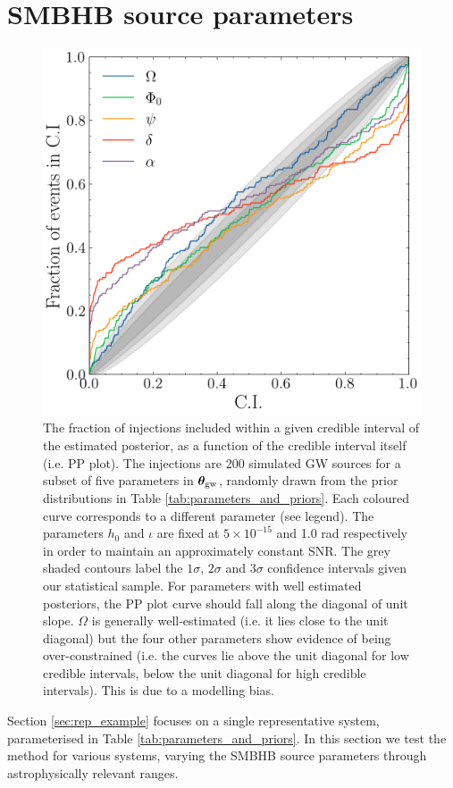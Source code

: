 \documentclass[fleqn,usenatbib,useAMS]{mnras}
\begin{document}
\section{SMBHB source parameters} \label{sec:parameter_space}
\begin{figure}
	\centering
	\includegraphics[width=\columnwidth]{images/pp_plot_new}
	\caption{The fraction of injections included within a given credible interval of the estimated posterior, as a function of the credible interval itself (i.e. PP plot). The injections are 200 simulated GW sources for a subset of five parameters in $\boldsymbol{\theta}_{\rm gw}$, randomly drawn from the prior distributions in Table \ref{tab:parameters_and_priors}. Each coloured curve corresponds to a different parameter (see legend). The parameters $h_0$ and $\iota$ are fixed at $5 \times 10^{-15}$ and 1.0 rad respectively in order to maintain an approximately constant SNR. The grey shaded contours label the $1\sigma$, $2\sigma$ and 3$\sigma$ confidence intervals given our statistical sample. For parameters with well estimated posteriors, the PP plot curve should fall along the diagonal of unit slope. $\Omega$ is generally well-estimated (i.e. it lies close to the unit diagonal) but the four other parameters show evidence of being over-constrained (i.e. the curves lie above the unit diagonal for low credible intervals, below the unit diagonal for high credible intervals). This is due to a modelling bias.}
	\label{fig:parameter_space}
\end{figure}
Section \ref{sec:rep_example} focuses on a single representative system, parameterised in Table \ref{tab:parameters_and_priors}. In this section we test the method for various systems, varying the SMBHB source parameters through astrophysically relevant ranges. \newline 
\end{document}
